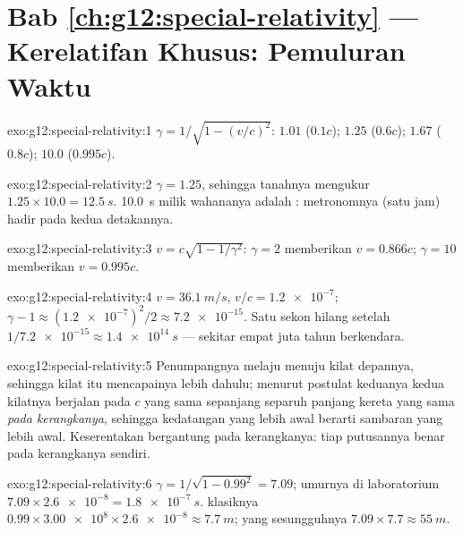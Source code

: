 \section*{Bab \ref{ch:g12:special-relativity} --- Kerelatifan Khusus: Pemuluran Waktu}

\begin{solution}{exo:g12:special-relativity:1}
$\gamma = 1/\sqrt{1 - (v/c)^2}$: $1.01$ ($0.1c$); $1.25$ ($0.6c$);
$1.67$ ($0.8c$); $10.0$ ($0.995c$).
\end{solution}

\begin{solution}{exo:g12:special-relativity:2}
$\gamma = 1.25$, sehingga tanahnya mengukur $1.25 \times 10.0 =
\qty{12.5}{s}$. \qty{10.0}{s} milik wahananya adalah :
metronomnya (satu jam) hadir pada kedua detakannya.
\end{solution}

\begin{solution}{exo:g12:special-relativity:3}
$v = c\sqrt{1 - 1/\gamma^2}$: $\gamma = 2$ memberikan $v = 0.866c$;
$\gamma = 10$ memberikan $v = 0.995c$.
\end{solution}

\begin{solution}{exo:g12:special-relativity:4}
$v = \qty{36.1}{m/s}$, $v/c = \num{1.2e-7}$;
$\gamma - 1 \approx (\num{1.2e-7})^2/2 \approx \num{7.2e-15}$. Satu
sekon hilang setelah $1/\num{7.2e-15} \approx \qty{1.4e14}{s}$ --- sekitar
empat juta tahun berkendara.
\end{solution}

\begin{solution}{exo:g12:special-relativity:5}
Penumpangnya melaju menuju kilat depannya, sehingga kilat itu mencapainya lebih dahulu;
menurut postulat keduanya kedua kilatnya berjalan pada $c$ yang sama sepanjang
separuh panjang kereta yang sama \emph{pada kerangkanya}, sehingga kedatangan yang lebih awal
berarti sambaran yang lebih awal. Keserentakan bergantung pada kerangkanya: tiap putusannya
benar pada kerangkanya sendiri.
\end{solution}

\begin{solution}{exo:g12:special-relativity:6}
$\gamma = 1/\sqrt{1 - 0.99^2} = 7.09$; umurnya di laboratorium
$7.09 \times \num{2.6e-8} = \qty{1.8e-7}{s}$.  klasiknya
$0.99 \times \num{3.00e8} \times \num{2.6e-8} \approx \qty{7.7}{m}$;
yang sesungguhnya $7.09 \times 7.7 \approx \qty{55}{m}$.
\end{solution}

